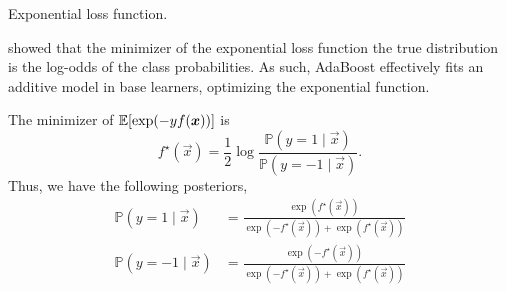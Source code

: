 \begin{marginfigure}
    \centering
    \caption{Exponential loss function.}
\end{marginfigure}

\citet{friedman2000additive} showed that the minimizer of the exponential loss function \wrt the true distribution is the
log-odds of the class probabilities. As such, AdaBoost effectively fits an additive model in base
learners, optimizing the exponential function.

\begin{lemma} \label{lem:adaboost1}
    The minimizer of $\mathbb{E}[\exp(-y f(\bm{x}))]$ is \[
        f^\star(\vec{x}) = \frac{1}{2} \log \frac{\mathbb{P}(y = 1 \mid \vec{x})}{\mathbb{P}(y = -1 \mid \vec{x})}.
    \]
    Thus, we have the following posteriors,
    \begin{align*}
        \mathbb{P}(y=1 \mid \vec{x})  & = \frac{\exp(f^\star(\vec{x}))}{\exp(-f^\star(\vec{x})) + \exp(f^\star(\vec{x}))}  \\
        \mathbb{P}(y=-1 \mid \vec{x}) & = \frac{\exp(-f^\star(\vec{x}))}{\exp(-f^\star(\vec{x})) + \exp(f^\star(\vec{x}))}
    \end{align*}
\end{lemma}

